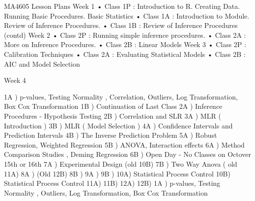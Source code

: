 MA4605 Lesson Plans
Week 1
•	Class 1P : Introduction to R.  Creating Data.  Running Basic Procedures. Basic  Statistics
•	Class 1A : Introduction to Module. Review of Inference Procedures. 
•	Class 1B : Review of Inference Procedures (contd)
Week 2
•	Class 2P : Running simple inference procedures.
•	Class 2A : More on Inference Procedures. 
•	Class 2B : Linear Models
Week 3
•	Class 2P : Calibration Techniques
•	Class 2A : Evaluating Statistical Models
•	Class 2B : AIC and Model Selection

Week 4


1A ) p-values, Testing Normality , Correlation, Outliers, Log Transformation, Box Cox Transformation
1B ) Continuation of Last Class
2A ) Inference Procedures - Hypothesis Testing
2B ) Correlation and SLR
3A ) MLR ( Introduction )
3B ) MLR ( Model Selection )
4A ) Confidence Intervals and Prediction Intervals
4B ) The Inverse Prediction Problem
5A ) Robust Regression, Weighted Regression
5B )  ANOVA, Interaction effects
6A ) Method Comparison Studies , Deming Regression
6B ) Open Day - No Classes on Octover 15th or 16th
7A ) Experimental Design  (old 10B)
7B ) Two Way Anova ( old 11A)
8A )   (Old 12B)
8B )
9A )
9B ) 
10A) Statistical Process Control
10B) Statistical Process Control 
11A)
11B)
12A)
12B) 1A ) p-values, Testing Normality , Outliers, Log Transformation, Box Cox Transformation
